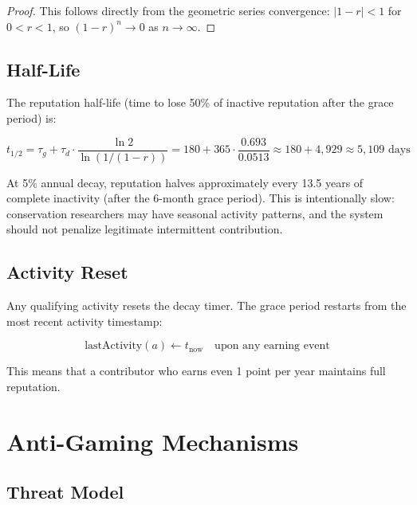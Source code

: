 \documentclass[11pt,letterpaper]{article}
\begin{document}
\begin{proof}
This follows directly from the geometric series convergence: $|1 - r| < 1$ for $0 < r < 1$, so $(1-r)^n \to 0$ as $n \to \infty$.
\end{proof}

\subsection{Half-Life}

The reputation half-life (time to lose 50\% of inactive reputation after the grace period) is:

\begin{equation}
    t_{1/2} = \tau_g + \tau_d \cdot \frac{\ln 2}{\ln(1/(1-r))} = 180 + 365 \cdot \frac{0.693}{0.0513} \approx 180 + 4{,}929 \approx 5{,}109 \text{ days}
\end{equation}

At 5\% annual decay, reputation halves approximately every 13.5 years of complete inactivity (after the 6-month grace period). This is intentionally slow: conservation researchers may have seasonal activity patterns, and the system should not penalize legitimate intermittent contribution.

\subsection{Activity Reset}

Any qualifying activity resets the decay timer. The grace period restarts from the most recent activity timestamp:

\begin{equation}
    \text{lastActivity}(a) \leftarrow t_{\text{now}} \quad \text{upon any earning event}
\end{equation}

This means that a contributor who earns even 1 point per year maintains full reputation.

\section{Anti-Gaming Mechanisms}
\label{sec:anti-gaming}

\subsection{Threat Model}
\end{document}

